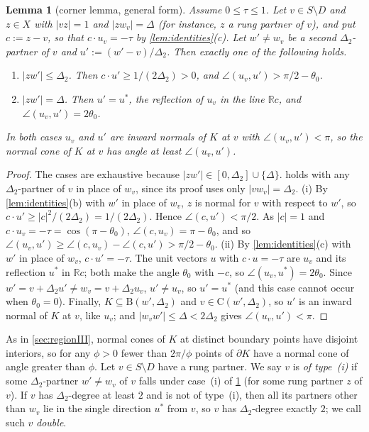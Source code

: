 \documentclass[11pt]{amsart}
\newtheorem{lemma}[theorem]{Lemma}
\theoremstyle{definition}
\theoremstyle{remark}
\newcommand{\R}{\mathbb{R}}
\newcommand{\Dt}{\Delta_2}
\newcommand{\Cc}{\mathrm{C}}      %
\newcommand{\Dd}{\mathrm{B}}      %
\begin{document}
\begin{lemma}[corner lemma, general form]\label{lem:corner2}
Assume $0\le\tau\le1$. Let $v\in S\setminus D$ and $z\in X$ with $|vz|=1$ and $|zw_v|=\Delta$ (for instance, $z$ a rung partner of $v$), and put $c:=z-v$, so that $c\cdot u_v=-\tau$ by \cref{lem:identities}(c). Let $w'\neq w_v$ be a second $\Dt$-partner of $v$ and $u':=(w'-v)/\Dt$. Then exactly one of the following holds.
\begin{enumerate}[label=(\roman*)]
\item $|zw'|\le\Dt$. Then $c\cdot u'\ge1/(2\Dt)>0$, and $\angle(u_v,u')>\pi/2-\theta_0$.
\item $|zw'|=\Delta$. Then $u'=u^*$, the reflection of $u_v$ in the line $\R c$, and $\angle(u_v,u')=2\theta_0$.
\end{enumerate}
In both cases $u_v$ and $u'$ are inward normals of $K$ at $v$ with $\angle(u_v,u')<\pi$, so the normal cone of $K$ at $v$ has angle at least $\angle(u_v,u')$.
\end{lemma}
\begin{proof}
The cases are exhaustive because $|zw'|\in[0,\Dt]\cup\{\Delta\}$.  holds with any $\Dt$-partner of $v$ in place of $w_v$, since its proof uses only $|vw_v|=\Dt$.
(i) By \cref{lem:identities}(b) with $w'$ in place of $w_v$, $z$ is normal for $v$ with respect to $w'$, so $c\cdot u'\ge|c|^2/(2\Dt)=1/(2\Dt)$. Hence $\angle(c,u')<\pi/2$. As $|c|=1$ and $c\cdot u_v=-\tau=\cos(\pi-\theta_0)$, $\angle(c,u_v)=\pi-\theta_0$, and so $\angle(u_v,u')\ge\angle(c,u_v)-\angle(c,u')>\pi/2-\theta_0$.
(ii) By \cref{lem:identities}(c) with $w'$ in place of $w_v$, $c\cdot u'=-\tau$. The unit vectors $u$ with $c\cdot u=-\tau$ are $u_v$ and its reflection $u^*$ in $\R c$; both make the angle $\theta_0$ with $-c$, so $\angle(u_v,u^*)=2\theta_0$. Since $w'=v+\Dt u'\neq w_v=v+\Dt u_v$, $u'\ne u_v$, so $u'=u^*$ (and this case cannot occur when $\theta_0=0$).
Finally, $K\subseteq\Dd(w',\Dt)$ and $v\in\Cc(w',\Dt)$, so $u'$ is an inward normal of $K$ at $v$, like $u_v$; and $|w_vw'|\le\Delta<2\Dt$ gives $\angle(u_v,u')<\pi$.
\end{proof}

As in \cref{sec:regionIII}, normal cones of $K$ at distinct boundary points have disjoint interiors, so for any $\phi>0$ fewer than $2\pi/\phi$ points of $\partial K$ have a normal cone of angle greater than $\phi$. Let $v\in S\setminus D$ have a rung partner. We say $v$ is \emph{of type~(i)} if some $\Dt$-partner $w'\ne w_v$ of $v$ falls under case~(i) of \cref{lem:corner2} (for some rung partner $z$ of $v$). If $v$ has $\Dt$-degree at least $2$ and is not of type~(i), then all its partners other than $w_v$ lie in the single direction $u^*$ from $v$, so $v$ has $\Dt$-degree exactly $2$; we call such $v$ \emph{double}.
\end{document}
